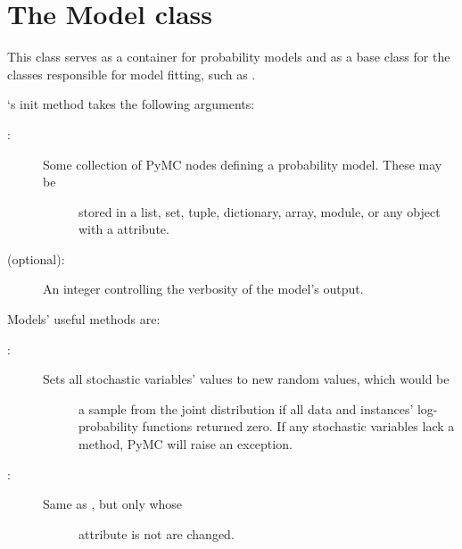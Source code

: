 \documentclass[letterpaper,10pt,english]{sphinxmanual}
\begin{document}
\section{The Model class}
\label{modelfitting:the-model-class}\label{modelfitting:sec-model}
This class serves as a container for probability models and as a base class for the classes responsible for model fitting, such as .

`s init method takes the following arguments:
\begin{description}
\item[{:}] \leavevmode\begin{description}
\item[{Some collection of PyMC nodes defining a probability model. These may be}] \leavevmode
stored in a list, set, tuple, dictionary, array, module, or any object with
a  attribute.

\end{description}

\item[{ (optional):}] \leavevmode
An integer controlling the verbosity of the model's output.

\end{description}

Models' useful methods are:
\begin{description}
\item[{:}] \leavevmode\begin{description}
\item[{Sets all stochastic variables' values to new random values, which would be}] \leavevmode
a sample from the joint distribution if all data and 
instances' log-probability functions returned zero. If any stochastic
variables lack a  method, PyMC will raise an exception.

\end{description}

\item[{:}] \leavevmode\begin{description}
\item[{Same as , but only  whose }] \leavevmode
attribute is not  are changed.

\end{description}

\end{description}
\end{document}

